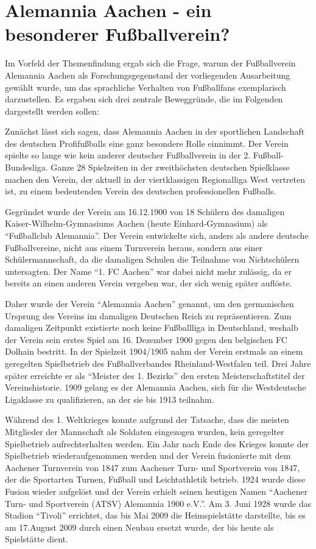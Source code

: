 \section{Alemannia Aachen - ein besonderer Fußballverein?}
Im Vorfeld der Themenfindung ergab sich die Frage, warum der Fußballverein Alemannia Aachen als Forschungsgegenstand der vorliegenden Ausarbeitung gewählt wurde, um das sprachliche
Verhalten von Fußballfans exemplarisch darzustellen.
Es ergaben sich drei zentrale Beweggründe, die im Folgenden dargestellt werden sollen:

Zunächst lässt sich sagen, dass Alemannia Aachen in der sportlichen Landschaft des deutschen Profifußballs eine ganz besondere Rolle einnimmt.
Der Verein spielte so lange wie kein anderer deutscher Fußballverein in der 2. Fußball-Bundesliga.
Ganze 28 Spielzeiten in der zweithöchsten deutschen Spielklasse machen den Verein, der aktuell in der viertklassigen Regionalliga West vertreten ist, zu einem bedeutenden Verein des deutschen professionellen Fußballs.

Gegründet wurde der Verein am 16.12.1900 von 18 Schülern des damaligen Kaiser-Wilhelm-Gymnasiums Aachen (heute Einhard-Gymnasium) als "`Fußballclub Alemannia"'.
Der Verein entwickelte sich, anders als andere deutsche Fußballvereine, nicht aus einem Turnverein heraus, sondern aus einer Schülermannschaft, da die damaligen Schulen die Teilnahme von Nichtschülern untersagten.
Der Name "`1. FC Aachen"' war dabei nicht mehr zulässig, da er bereits an einen anderen Verein vergeben war, der sich wenig später auflöste.

Daher wurde der Verein "`Alemannia Aachen"' genannt, um den germanischen Ursprung des Vereins im damaligen Deutschen Reich zu repräsentieren.
Zum damaligen Zeitpunkt existierte noch keine Fußballliga in Deutschland, weshalb der Verein sein erstes Spiel am 16. Dezember 1900 gegen den belgischen FC Dolhain bestritt.
In der Spielzeit 1904/1905 nahm der Verein erstmals an einem geregelten Spielbetrieb des Fußballverbandes Rheinland-Westfalen teil.
Drei Jahre später erreichte er als "`Meister des 1. Bezirks"' den ersten Meisterschaftstitel der Vereinshistorie.
1909 gelang es der Alemannia Aachen, sich für die Westdeutsche Ligaklasse zu qualifizieren, an der sie bis 1913 teilnahm.

Während des 1. Weltkrieges konnte aufgrund der Tatsache, dass die meisten Mitglieder der Mannschaft als Soldaten eingezogen wurden, kein geregelter Spielbetrieb aufrechterhalten werden.
Ein Jahr nach Ende des Krieges konnte der Spielbetrieb wiederaufgenommen werden und der Verein fusionierte mit dem Aachener Turnverein von 1847 zum Aachener Turn- und Sportverein von 1847, der die Sportarten Turnen, Fußball und Leichtathletik betrieb.
1924 wurde diese Fusion wieder aufgelöst und der Verein erhielt seinen heutigen Namen "`Aachener Turn- und Sportverein (ATSV) Alemannia 1900 e.V."'.
Am 3. Juni 1928 wurde das Stadion "`Tivoli"' errichtet, das bis Mai 2009 die Heimspielstätte darstellte, bis es am 17.August 2009 durch einen Neubau ersetzt wurde, der bis heute als Spielstätte dient.

